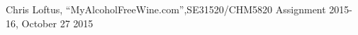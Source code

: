 \documentclass[12pt]{article}
\begin{document}
\clearpage


\begin{thebibliography}{5}

 Chris Loftus, ``MyAlcoholFreeWine.com'',SE31520/CHM5820 Assignment 2015-16, October 27 2015


\end{thebibliography}
\end{document}
